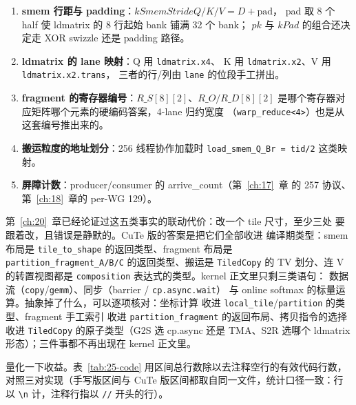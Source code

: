 \begin{enumerate}
  \item \textbf{smem 行距与 padding}：$kSmemStrideQ/K/V = D+\mathrm{pad}$，
        pad 取 8 个 half 使 ldmatrix 的 8 行起始 bank 铺满 32 个 bank；
        $pk$ 与 $kPad$ 的组合还决定走 XOR swizzle 还是 padding 路径。
  \item \textbf{ldmatrix 的 lane 映射}：Q 用 \texttt{ldmatrix.x4}、
        K 用 \texttt{ldmatrix.x2}、V 用 \texttt{ldmatrix.\allowbreak{}x2.trans}，
        三者的行/列由 \texttt{lane} 的位段手工拼出。
  \item \textbf{fragment 的寄存器编号}：$R\_S[8][2]$、$R\_O/R\_D[8][2]$
        是哪个寄存器对应矩阵哪个元素的硬编码答案，4-lane 归约宽度
        （\texttt{warp\_\allowbreak{}reduce\allowbreak{}<4>}）也是从这套编号推出来的。
  \item \textbf{搬运粒度的地址划分}：256 线程协作加载时
        \texttt{load\_\allowbreak{}smem\_\allowbreak{}Q\_\allowbreak{}Br =\allowbreak{} tid/\allowbreak{}2} 这类映射。
  \item \textbf{屏障计数}：producer/consumer 的 arrive\_count（第~\ref{ch:17}~章
        的 257 协议、第~\ref{ch:18}~章的 per-WG 129）。
\end{enumerate}

第~\ref{ch:20}~章已经论证过这五类事实的联动代价：改一个 tile 尺寸，至少三处
要跟着改，且错误是静默的。CuTe 版的答案是把它们全部收进
编译期类型：smem 布局是 \texttt{tile\_\allowbreak{}to\_\allowbreak{}shape} 的返回类型、fragment
布局是 \texttt{partition\_\allowbreak{}fragment\_\allowbreak{}A/B/C} 的返回类型、搬运是
\texttt{TiledCopy} 的 TV 划分、连 V 的转置视图都是
\texttt{composition} 表达式的类型。kernel 正文里只剩三类语句：
数据流（\texttt{copy}/\texttt{gemm}）、同步（barrier / \texttt{cp.\allowbreak{}async.\allowbreak{}wait}）
与 online softmax 的标量运算。抽象掉了什么，可以逐项核对：坐标计算
收进 \texttt{local\_tile}/\texttt{partition} 的类型、fragment 手工索引
收进 \texttt{partition\_\allowbreak{}fragment} 的返回布局、拷贝指令的选择
收进 \texttt{TiledCopy} 的原子类型（G2S 选 cp.async 还是 TMA、S2R 选哪个
ldmatrix 形态）；三件事都不再出现在 kernel 正文里。

量化一下收益。表~\ref{tab:25-code} 用区间总行数除以去注释空行的有效代码行数，
对照三对实现（手写版区间与 CuTe 版区间都取自同一文件，统计口径一致：行以
\texttt{\textbackslash n} 计，注释行指以 \texttt{//} 开头的行）。

